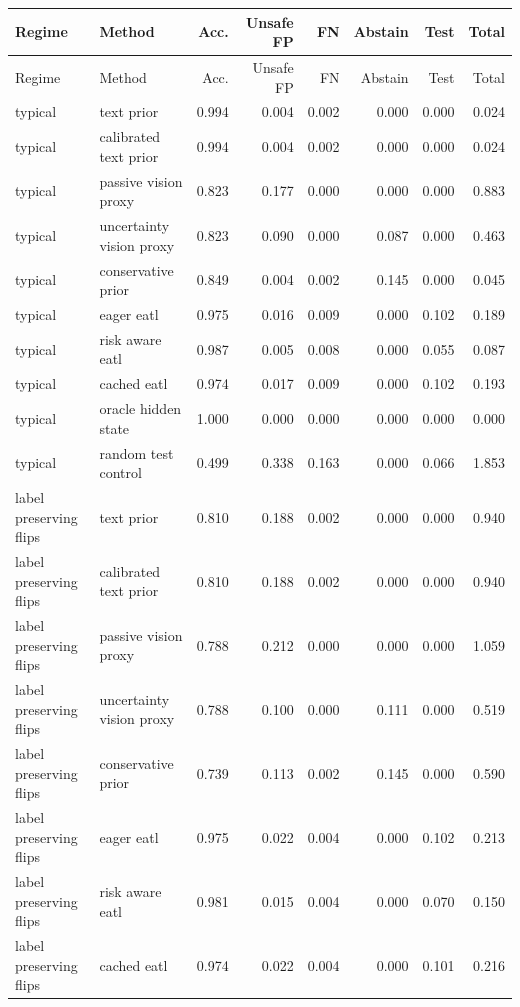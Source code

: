 \begin{longtable}{llrrrrrr}
\toprule
Regime & Method & Acc. & Unsafe FP & FN & Abstain & Test & Total \\
\midrule
\endfirsthead
\toprule
Regime & Method & Acc. & Unsafe FP & FN & Abstain & Test & Total \\
\midrule
\endhead
typical & text prior & 0.994 & 0.004 & 0.002 & 0.000 & 0.000 & 0.024 \\
typical & calibrated text prior & 0.994 & 0.004 & 0.002 & 0.000 & 0.000 & 0.024 \\
typical & passive vision proxy & 0.823 & 0.177 & 0.000 & 0.000 & 0.000 & 0.883 \\
typical & uncertainty vision proxy & 0.823 & 0.090 & 0.000 & 0.087 & 0.000 & 0.463 \\
typical & conservative prior & 0.849 & 0.004 & 0.002 & 0.145 & 0.000 & 0.045 \\
typical & eager eatl & 0.975 & 0.016 & 0.009 & 0.000 & 0.102 & 0.189 \\
typical & risk aware eatl & 0.987 & 0.005 & 0.008 & 0.000 & 0.055 & 0.087 \\
typical & cached eatl & 0.974 & 0.017 & 0.009 & 0.000 & 0.102 & 0.193 \\
typical & oracle hidden state & 1.000 & 0.000 & 0.000 & 0.000 & 0.000 & 0.000 \\
typical & random test control & 0.499 & 0.338 & 0.163 & 0.000 & 0.066 & 1.853 \\
\midrule
label preserving flips & text prior & 0.810 & 0.188 & 0.002 & 0.000 & 0.000 & 0.940 \\
label preserving flips & calibrated text prior & 0.810 & 0.188 & 0.002 & 0.000 & 0.000 & 0.940 \\
label preserving flips & passive vision proxy & 0.788 & 0.212 & 0.000 & 0.000 & 0.000 & 1.059 \\
label preserving flips & uncertainty vision proxy & 0.788 & 0.100 & 0.000 & 0.111 & 0.000 & 0.519 \\
label preserving flips & conservative prior & 0.739 & 0.113 & 0.002 & 0.145 & 0.000 & 0.590 \\
label preserving flips & eager eatl & 0.975 & 0.022 & 0.004 & 0.000 & 0.102 & 0.213 \\
label preserving flips & risk aware eatl & 0.981 & 0.015 & 0.004 & 0.000 & 0.070 & 0.150 \\
label preserving flips & cached eatl & 0.974 & 0.022 & 0.004 & 0.000 & 0.101 & 0.216 \\

\end{longtable}
